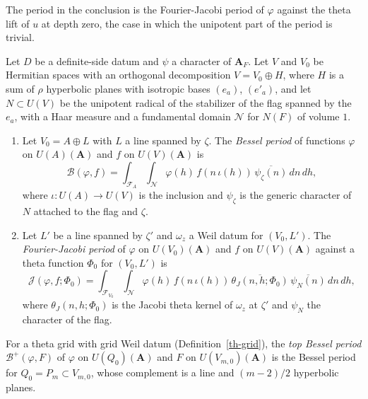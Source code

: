 The period in the conclusion is the Fourier-Jacobi period of $\varphi$ against
the theta lift of $u$ at depth zero, the case in which the unipotent part of
the period is trivial.

\begin{definition}\label{th-periods}
Let $D$ be a definite-side datum and $\psi$ a character of $\mathbf A_F$. Let
$V$ and $V_0$ be Hermitian spaces with an orthogonal decomposition
$V=V_0\oplus H$, where $H$ is a sum of $\rho$ hyperbolic planes with isotropic
bases $(e_a)$, $(e'_a)$, and let $N\subset U(V)$ be the unipotent radical of
the stabilizer of the flag spanned by the $e_a$, with a Haar measure and a
fundamental domain $\mathcal N$ for $N(F)$ of volume $1$.
\begin{enumerate}
\item Let $V_0=A\oplus L$ with $L$ a line spanned by $\zeta$. The
  \emph{Bessel period} of functions $\varphi$ on $U(A)(\mathbf A)$ and $f$ on
  $U(V)(\mathbf A)$ is
  \[
  \mathcal B(\varphi,f)=\int_{\mathcal F_A}\int_{\mathcal N}\varphi(h)\,
  f(n\,\iota(h))\,\overline{\psi_{\zeta}(n)}\,dn\,dh,
  \]
  where $\iota\colon U(A)\to U(V)$ is the inclusion and $\psi_\zeta$ is the
  generic character of $N$ attached to the flag and $\zeta$.
\item Let $L'$ be a line spanned by $\zeta'$ and $\omega_z$ a Weil datum for
  $(V_0,L')$. The \emph{Fourier-Jacobi period} of $\varphi$ on
  $U(V_0)(\mathbf A)$ and $f$ on $U(V)(\mathbf A)$ against a theta function
  $\Phi_0$ for $(V_0,L')$ is
  \[
  \mathcal J(\varphi,f;\Phi_0)=\int_{\mathcal F_{V_0}}\int_{\mathcal N}\varphi(h)\,
  f(n\,\iota(h))\,\overline{\theta_J(n,h;\Phi_0)}\,\overline{\psi_N(n)}\,dn\,dh,
  \]
  where $\theta_J(n,h;\Phi_0)$ is the Jacobi theta kernel of $\omega_z$ at
  $\zeta'$ and $\psi_N$ the character of the flag.
\end{enumerate}
For a theta grid with grid Weil datum (Definition~\ref{th-grid}), the
\emph{top Bessel period} $\mathcal B^+(\varphi,F)$ of $\varphi$ on
$U(Q_0)(\mathbf A)$ and $F$ on $U(V_{m,0})(\mathbf A)$ is the Bessel period
for $Q_0=P_m\subset V_{m,0}$, whose complement is a line and $(m-2)/2$
hyperbolic planes.
\end{definition}

